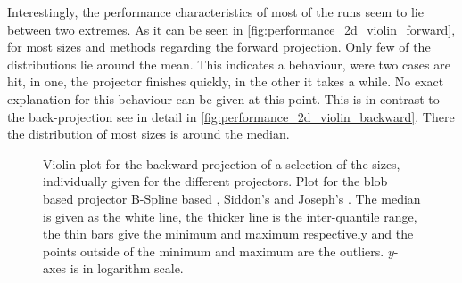 Interestingly, the performance characteristics of most of the runs seem to lie between two extremes.
As it can be seen in \autoref{fig:performance_2d_violin_forward}, for most sizes and methods
regarding the forward projection. Only few of the distributions lie around the mean. This indicates
a behaviour, were two cases are hit, in one, the projector finishes quickly, in the other it takes a
while. No exact explanation for this behaviour can be given at this point. This is in contrast to
the back-projection see in detail in \autoref{fig:performance_2d_violin_backward}. There the
distribution of most sizes is around the median.

\begin{figure}
	\centering



	\caption{Violin plot for the backward projection of a selection of the sizes, individually
		given for the different projectors. Plot for the blob based projector
		 B-Spline based
		, Siddon's
		 and Joseph's
		. The median is given as the white
                line, the thicker line is the inter-quantile range, the thin bars give the minimum
                and maximum respectively and the points outside of the minimum and maximum are the
                outliers. \(y\)-axes is in logarithm scale.}%
	\label{fig:performance_2d_violin_backward}
\end{figure}

